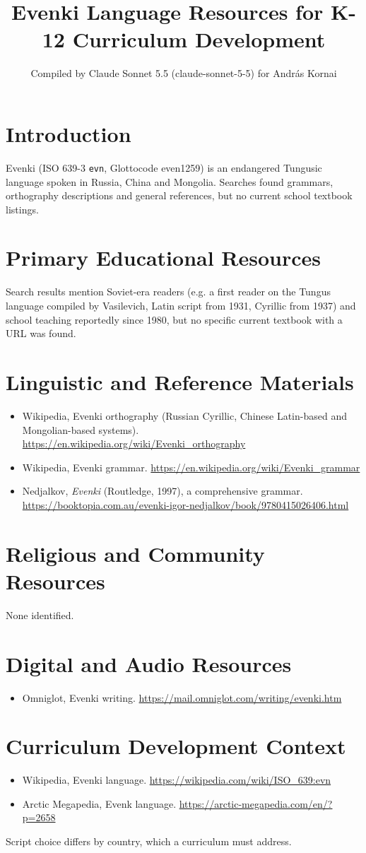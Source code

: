 \documentclass[12pt]{article}
\title{Evenki Language Resources for K-12 Curriculum Development}
\author{Compiled by Claude Sonnet 5.5 (claude-sonnet-5-5) for Andr\'as Kornai}
\date{}
\begin{document}
\maketitle
\section{Introduction}
Evenki (ISO 639-3 \texttt{evn}, Glottocode even1259) is an endangered Tungusic language spoken in Russia, China and Mongolia. Searches found grammars, orthography descriptions and general references, but no current school textbook listings.
\section{Primary Educational Resources}
Search results mention Soviet-era readers (e.g. a first reader on the Tungus language compiled by Vasilevich, Latin script from 1931, Cyrillic from 1937) and school teaching reportedly since 1980, but no specific current textbook with a URL was found.
\section{Linguistic and Reference Materials}
\begin{itemize}
\item Wikipedia, Evenki orthography (Russian Cyrillic, Chinese Latin-based and Mongolian-based systems). \url{https://en.wikipedia.org/wiki/Evenki_orthography}
\item Wikipedia, Evenki grammar. \url{https://en.wikipedia.org/wiki/Evenki_grammar}
\item Nedjalkov, \emph{Evenki} (Routledge, 1997), a comprehensive grammar. \url{https://booktopia.com.au/evenki-igor-nedjalkov/book/9780415026406.html}
\end{itemize}
\section{Religious and Community Resources}
None identified.
\section{Digital and Audio Resources}
\begin{itemize}
\item Omniglot, Evenki writing. \url{https://mail.omniglot.com/writing/evenki.htm}
\end{itemize}
\section{Curriculum Development Context}
\begin{itemize}
\item Wikipedia, Evenki language. \url{https://wikipedia.com/wiki/ISO_639:evn}
\item Arctic Megapedia, Evenk language. \url{https://arctic-megapedia.com/en/?p=2658}
\end{itemize}
Script choice differs by country, which a curriculum must address.
\end{document}
